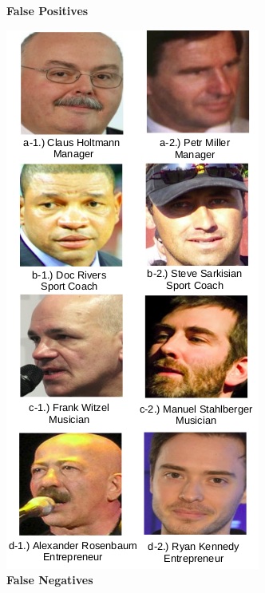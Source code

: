\documentclass[12pt,english]{article}
\begin{document}
\begin{figure}[H]
\begin{minipage}[b]{0.48\textwidth}
    \caption{\textbf{False Positives}}
    \label{fig:ex2fp}
  \end{minipage}
  \hfill
  \begin{minipage}[b]{0.5\textwidth}
   \includegraphics[width=\textwidth]{figures/ex2_fn.png}
    \caption{\textbf{False Negatives}}
    \label{fig:ex2fn}
  \end{minipage}
\end{figure}
\end{document}
